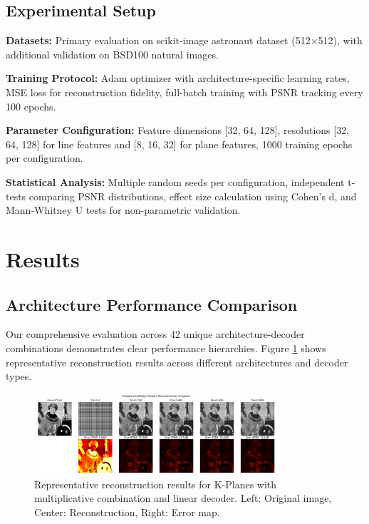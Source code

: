 \documentclass{article}
\begin{document}
\subsection{Experimental Setup}

\textbf{Datasets:} Primary evaluation on scikit-image astronaut dataset (512×512), with additional validation on BSD100 natural images.

\textbf{Training Protocol:} Adam optimizer with architecture-specific learning rates, MSE loss for reconstruction fidelity, full-batch training with PSNR tracking every 100 epochs.

\textbf{Parameter Configuration:} Feature dimensions [32, 64, 128], resolutions [32, 64, 128] for line features and [8, 16, 32] for plane features, 1000 training epochs per configuration.

\textbf{Statistical Analysis:} Multiple random seeds per configuration, independent t-tests comparing PSNR distributions, effect size calculation using Cohen's d, and Mann-Whitney U tests for non-parametric validation.

\section{Results}

\subsection{Architecture Performance Comparison}

Our comprehensive evaluation across 42 unique architecture-decoder combinations demonstrates clear performance hierarchies. Figure \ref{fig:architecture_comparison} shows representative reconstruction results across different architectures and decoder types.

\begin{figure}[htbp]
\centering
\includegraphics[width=0.8\textwidth]{experiments/exp001_architecture_comparison/full_results/visualizations/K-planesmultiply_linear_seed0.png}
\caption{Representative reconstruction results for K-Planes with multiplicative combination and linear decoder. Left: Original image, Center: Reconstruction, Right: Error map.}
\label{fig:architecture_comparison}
\end{figure}
\end{document}
